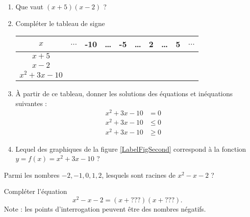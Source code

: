 
\begin{example}

\begin{enumerate}
    \item
        Que vaut \( (x+5)(x-2)\) ?
    \item
        Compléter le tableau de signe
        \begin{center}
            \begin{tabular}[h]{|c||c|c|c|c|c|c|c|c|c|}
                \hline
                    \( x\)&\( \ldots\)&-10&\ldots&-5&\ldots&2&\ldots&5&\( \ldots\)\\
                    \hline
                    \( x+5\)& & & & & & & && \\
                    \hline
                    \( x-2\)&&&&&&&&&\\
                    \hline
                    \(x^2+3x-10\)&&&&&&&&&\\
                    \hline
            \end{tabular}
        \end{center}
    \item
        À partir de ce tableau, donner les solutions des équations et inéquations suivantes :
        \begin{subequations}
            \begin{align}
                x^2+3x-10&=0\\
                x^2+3x-10&\leq0\\
                x^2+3x-10&\geq0
            \end{align}
        \end{subequations}
    \item
        Lequel des graphiques de la figure \ref{LabelFigSecond} correspond à la fonction \( y=f(x)=x^2+3x-10\) ?
\newcommand{\CaptionFigSecond}{Laquelle de ces trois courbes est \( x^2+3x-10\) ?}


\end{enumerate}
    
\end{example}

\begin{example}
    Parmi les nombres \( -2,-1,0,1,2\), lesquels sont racines de \( x^2-x-2\) ?

    Compléter l'équation
    \begin{equation}
        x^2-x-2=(x+???)(x+???).
    \end{equation}
    Note : les points d'interrogation peuvent être des nombres négatifs.
\end{example}


